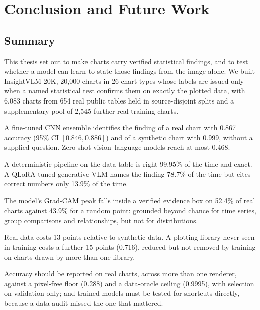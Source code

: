 \chapter{Conclusion and Future Work}
\label{ch:conclusion}

\section{Summary}

This thesis set out to make charts carry verified statistical findings, and to test
whether a model can learn to state those findings from the image alone. We built
InsightVLM-20K, 20{,}000 charts in 26 chart types whose labels are issued only when a
named statistical test confirms them on exactly the plotted data, with 6{,}083 charts
from 654 real public tables held in source-disjoint splits and a supplementary pool of
2{,}545 further real training charts.

\begin{description}[leftmargin=1.2cm,style=nextline,font=\bfseries]
  \item[RQ1.] A fine-tuned CNN ensemble identifies the finding of a real chart with
  0.867 accuracy (95\% CI $[0.846, 0.886]$) and of a synthetic chart with 0.999, without
  a supplied question. Zero-shot vision--language models reach at most 0.468.
  \item[RQ2.] A deterministic pipeline on the data table is right 99.95\% of the time and
  exact. A QLoRA-tuned generative VLM names the finding 78.7\% of the time but cites
  correct numbers only 13.9\% of the time.
  \item[RQ3.] The model's Grad-CAM peak falls inside a verified evidence box on 52.4\% of real
  charts against 43.9\% for a random point: grounded beyond chance for time series, group
  comparisons and relationships, but not for distributions.
  \item[RQ4.] Real data costs 13 points relative to synthetic data. A plotting library
  never seen in training costs a further 15 points (0.716), reduced but not removed by
  training on charts drawn by more than one library.
  \item[RQ5.] Accuracy should be reported on real charts, across more than one renderer,
  against a pixel-free floor (0.288) and a data-oracle ceiling (0.9995), with selection
  on validation only; and trained models must be tested for shortcuts directly, because
  a data audit missed the one that mattered.
\end{description}

